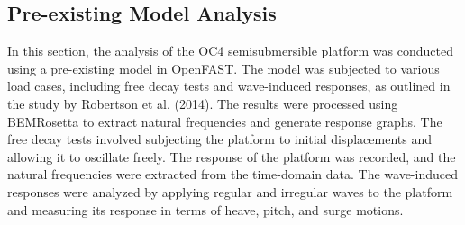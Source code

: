 \documentclass[a4paper]{article}
\begin{document}
\subsection{Pre-existing Model Analysis}

\hspace*{0.5cm}In this section, the analysis of the OC4 semisubmersible platform was conducted using a pre-existing model in OpenFAST. The model was subjected to various load cases, including free decay tests and wave-induced responses, as outlined in the study by Robertson et al. (2014). The results were processed using BEMRosetta to extract natural frequencies and generate response graphs.
The free decay tests involved subjecting the platform to initial displacements and allowing it to oscillate freely. The response of the platform was recorded, and the natural frequencies were extracted from the time-domain data. The wave-induced responses were analyzed by applying regular and irregular waves to the platform and measuring its response in terms of heave, pitch, and surge motions.
\end{document}

